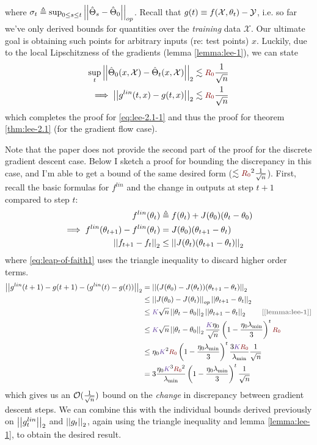 \documentclass{article}
\newcommand\mc{\mathcal}
\begin{document}
where $\sigma_t \triangleq \sup_{0 \leq s \leq t} \norm[op]{\hat\Theta_s - \hat\Theta_0}$. Recall that $g(t) \equiv \g$, i.e. so far we've only derived bounds for quantities over the \textit{training} data $\mc X$. Our ultimate goal is obtaining such points for arbitrary inputs (re: test points) $x$. Luckily, due to the local Lipschitzness of the gradients (lemma \ref{lemma:lee-1}), we can state
\begin{align}
	  \sup_t \norm{\hat\Theta_0(x, \mc X) - \hat\Theta_t(x, \mc X)} 
	  	&\lesssim \r \inv{\sqrt n} \\
	  \implies \norm{g^{lin}(t, x) - g(t, x)}
	  	&\lesssim \r \inv{\sqrt n}
\end{align}
which completes the proof for \ref{eq:lee-2.1-1} and thus the proof for theorem \ref{thm:lee-2.1} (for the gradient flow case). 

Note that the paper does not provide the second part of the proof for the discrete gradient descent case. Below I sketch a proof for bounding the discrepancy in this case, and I'm able to get a bound of the same desired form ($\lesssim \r^2 \inv{\sqrt n}$). First, recall the basic formulas for $f^{lin}$ and the change in outputs at step $t+1$ compared to step $t$:
\begin{align}
	f^{lin}(\theta_t)
	&\triangleq f(\theta_t) + J(\theta_0) (\theta_t - \theta_0) \\
	\implies f^{lin}(\theta_{t+1}) 
	- f^{lin}(\theta_t)
	&= J(\theta_0) (\theta_{t+1} - \theta_t) \\
	\norm{f_{t+1} - f_t}
	&\leq \norm{J(\theta_t)(\theta_{t+1} - \theta_t)} \label{eq:leap-of-faith1}
\end{align}
where \ref{eq:leap-of-faith1} uses the triangle inequality to discard higher order terms. 
\begin{align}
	\norm{g^{lin}(t+1) - g(t+1) -  (g^{lin}(t) - g(t))}	
	&= \norm{ (J(\theta_0) - J(\theta_t))(\theta_{t+1} - \theta_t) } \\
	&\leq \norm[op]{J(\theta_0) - J(\theta_t)} \norm{\theta_{t+1} - \theta_t} \\
	&\leq \k \sqrt{n} \norm{\theta_t - \theta_0} \norm{\theta_{t+1} - \theta_t} 
	\qquad \mtgray{[\ref{lemma:lee-1}]} \\
	&\leq \k \sqrt{n}  \norm{\theta_t - \theta_0}  
	\frac{\k \eta_0}{\sqrt{n}} \lr{1 - \frac{\eta_0 \lambda_{\text{min}}}{3}}^t \r \\
	&\leq  \eta_0 \k^2 \r  \lr{1 - \frac{\eta_0 \lambda_{\text{min}}}{3}}^t  \frac{    3 \k \r   }{\lambda_{\text{min}}} \inv{\sqrt n} \\
	&= 3 \frac{ \eta_0 \k^3 \r^2  }{ \lambda_{\text{min}}  } \lr{1 - \frac{\eta_0 \lambda_{\text{min}}}{3}}^t  \inv{\sqrt n}
\end{align}
which gives us an $\mc O(\inv{\sqrt n})$ bound on the \textit{change} in discrepancy between gradient descent steps. We can combine this with the individual bounds derived previously on $\norm{g^{lin}_t}$ and $\norm{g_t}$, again using the triangle inequality and lemma \ref{lemma:lee-1}, to obtain the desired result.
\end{document}
